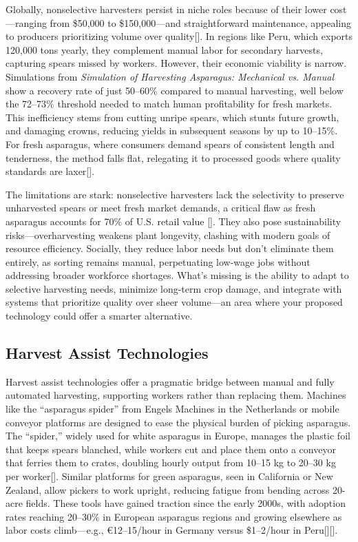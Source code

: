 Globally, nonselective harvesters persist in niche roles because of their lower cost—ranging from \$50,000 to \$150,000—and straightforward maintenance, appealing to producers prioritizing volume over quality[\cite{usda2023asparagus}]. In regions like Peru, which exports 120,000 tons yearly, they complement manual labor for secondary harvests, capturing spears missed by workers. However, their economic viability is narrow. Simulations from \textit{Simulation of Harvesting Asparagus: Mechanical vs. Manual} \cite{waea2004simulation} show a recovery rate of just 50--60\% compared to manual harvesting, well below the 72--73\% threshold needed to match human profitability for fresh markets. This inefficiency stems from cutting unripe spears, which stunts future growth, and damaging crowns, reducing yields in subsequent seasons by up to 10--15\%. For fresh asparagus, where consumers demand spears of consistent length and tenderness, the method falls flat, relegating it to processed goods where quality standards are laxer[\cite{usda2023asparagus}].

The limitations are stark: nonselective harvesters lack the selectivity to preserve unharvested spears or meet fresh market demands, a critical flaw as fresh asparagus accounts for 70\% of U.S. retail value [\cite{usda2023asparagus}]. They also pose sustainability risks—overharvesting weakens plant longevity, clashing with modern goals of resource efficiency. Socially, they reduce labor needs but don’t eliminate them entirely, as sorting remains manual, perpetuating low-wage jobs without addressing broader workforce shortages. What’s missing is the ability to adapt to selective harvesting needs, minimize long-term crop damage, and integrate with systems that prioritize quality over sheer volume—an area where your proposed technology could offer a smarter alternative.

\subsection{Harvest Assist Technologies}
Harvest assist technologies offer a pragmatic bridge between manual and fully automated harvesting, supporting workers rather than replacing them. Machines like the ``asparagus spider'' from Engels Machines in the Netherlands or mobile conveyor platforms are designed to ease the physical burden of picking asparagus. The ``spider,'' widely used for white asparagus in Europe, manages the plastic foil that keeps spears blanched, while workers cut and place them onto a conveyor that ferries them to crates, doubling hourly output from 10--15 kg to 20--30 kg per worker[\cite{freshplaza2019automation}]. Similar platforms for green asparagus, seen in California or New Zealand, allow pickers to work upright, reducing fatigue from bending across 20-acre fields. These tools have gained traction since the early 2000s, with adoption rates reaching 20--30\% in European asparagus regions and growing elsewhere as labor costs climb—e.g., €12--15/hour in Germany versus \$1--2/hour in Peru[\cite{freshplaza2018engels}][\cite{engelsmachines2020about}].

